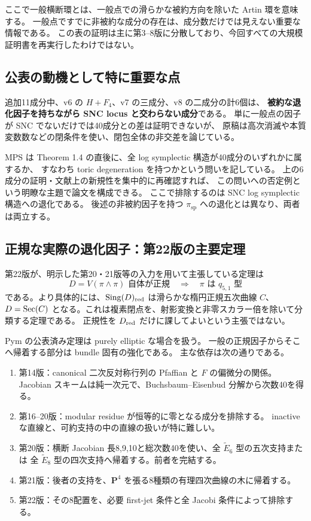 \documentclass[11pt,a4paper]{ltjsarticle}
\newcommand{\PP}{\mathbf P}\newcommand{\CC}{\mathbf C}\newcommand{\QQ}{\mathbf Q}
\theoremstyle{remark}\newtheorem{remark}[proposition]{注意}
\begin{document}
ここで一般横断環とは、一般点での滑らかな被約方向を除いた Artin 環を意味する。
一般点ですでに非被約な成分の存在は、成分数だけでは見えない重要な情報である。
この表の証明は主に第3--8版に分散しており、今回すべての大規模証明書を再実行したわけではない。

\subsection{公表の動機として特に重要な点}

追加11成分中、v6 の $H+F_4$、v7 の三成分、v8 の二成分の計6個は、
\textbf{被約な退化因子を持ちながら SNC locus と交わらない成分}である。
単に一般点の因子が SNC でないだけでは40成分との差は証明できないが、
原稿は高次消滅や本質変数数などの閉条件を使い、閉包全体の非交差を論じている。

MPS は Theorem 1.4 の直後に、全 log symplectic 構造が40成分のいずれかに属するか、
すなわち toric degeneration を持つかという問いを記している\cite[p.~7]{MPS}。
上の6成分の証明・文献上の新規性を集中的に再確認すれば、
この問いへの否定例という明瞭な主題で論文を構成できる。
ここで排除するのは SNC log symplectic 構造への退化である。
後述の非被約因子を持つ $\pi_{\mathrm{sp}}$ への退化とは異なり、両者は両立する。

\subsection{正規な実際の退化因子：第22版の主要定理}

第22版が、明示した第20・21版等の入力を用いて主張している定理は
\[
 D=V(\pi\wedge\pi)\text{ 自体が正規}
 \quad\Longrightarrow\quad
 \pi\text{ は }q_{5,1}\text{ 型}
\]
である。より具体的には、$\operatorname{Sing}(D)_{\rm red}$ は滑らかな楕円正規五次曲線 $C$、
$D=\operatorname{Sec}(C)$ となる。これは複素閉点を、射影変換と非零スカラー倍を除いて分類する定理である。
正規性を $D_{\rm red}$ だけに課してよいという主張ではない。

Pym の公表済み定理は purely elliptic な場合を扱う\cite{PymElliptic}。
一般の正規因子からそこへ帰着する部分は bundle 固有の強化である。
主な依存は次の通りである。
\begin{enumerate}
\item 第14版：canonical 二次反対称行列の Pfaffian と $F$ の偏微分の関係。
Jacobian スキームは純一次元で、Buchsbaum--Eisenbud 分解から次数40を得る。
\item 第16--20版：modular residue が恒等的に零となる成分を排除する。
inactive な直線と、可約支持の中の直線の扱いが特に難しい。
\item 第20版：横断 Jacobian 長8,9,10と総次数40を使い、全 $\widetilde E_6$ 型の五次支持または
全 $\widetilde E_8$ 型の四次支持へ帰着する。前者を完結する。
\item 第21版：後者の支持を、$\PP^4$ を張る8種類の有理四次曲線の木に帰着する。
\item 第22版：その8配置を、必要 first-jet 条件と全 Jacobi 条件によって排除する。
\end{enumerate}
\end{document}
